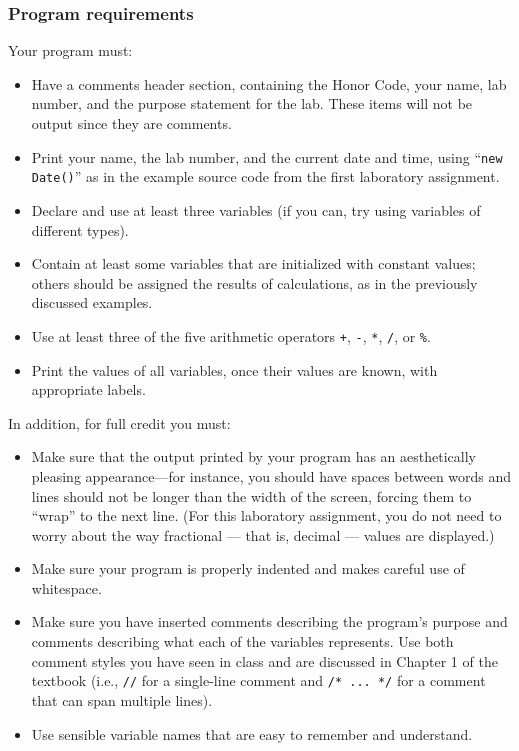 \subsubsection*{Program requirements}
\noindent Your program must:
\begin{itemize}
\item
Have a  comments header section, containing the Honor Code, your name, lab number, and the purpose statement for the lab.
These items will not be output since they are comments.
\item
Print your name, the lab number, and the current date and time, using
``{\tt new Date()}'' as in the example source code from the first laboratory assignment.
\item
Declare and use at least three variables (if you can, try using variables of different types).
\item
Contain at least some variables that are initialized with constant values; others
should be assigned the results of calculations, as in the previously discussed examples.
\item
Use at least three of the five arithmetic operators \verb$+$, \verb$-$, \verb$*$,
\verb$/$, or \verb$%$.
\item
Print the values of all variables, once their values are known, with appropriate labels.
\end{itemize}


\noindent In addition, for full credit you must:
\begin{itemize}

\item Make sure that the output printed by your program has an aesthetically pleasing appearance---for instance, you
  should have spaces between words and lines should not be longer than the width of the screen, forcing them to ``wrap''
  to the next line. (For this laboratory assignment, you do not need to worry about the way fractional --- that is,
  decimal --- values are displayed.)

\item Make sure your program is properly indented and makes careful use of whitespace.

\item Make sure you have inserted comments describing the program's purpose and comments describing what each of the
  variables represents. Use both comment styles you have seen in class and are discussed in Chapter 1 of the textbook
  (i.e., {\tt //} for a single-line comment and {\tt /* ...\ */} for a comment that can span multiple lines).

\item Use sensible variable names that are easy to remember and understand.

\end{itemize}


